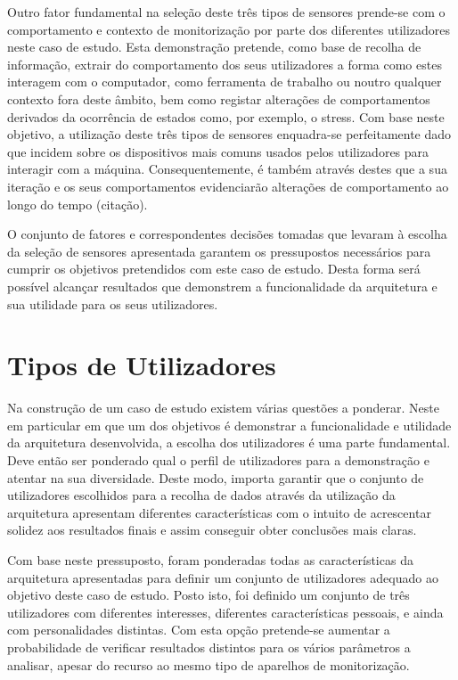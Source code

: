 Outro fator fundamental na seleção deste três tipos de sensores prende-se com o comportamento e contexto de monitorização por parte dos diferentes utilizadores neste caso de estudo. Esta demonstração pretende, como base de recolha de informação, extrair do comportamento dos seus utilizadores a forma como estes interagem com o computador, como ferramenta de trabalho ou noutro qualquer contexto fora deste âmbito, bem como registar alterações de comportamentos derivados da ocorrência de estados como, por exemplo, o stress. Com base neste objetivo, a utilização deste três tipos de sensores enquadra-se perfeitamente dado que incidem sobre os dispositivos mais comuns usados pelos utilizadores para interagir com a máquina. Consequentemente, é também através destes que a sua iteração e os seus comportamentos evidenciarão alterações de comportamento ao longo do tempo (citação). 

O conjunto de fatores e correspondentes decisões tomadas que levaram à escolha da seleção de sensores apresentada garantem os pressupostos necessários para cumprir os objetivos pretendidos com este caso de estudo. Desta forma será possível alcançar resultados que demonstrem a funcionalidade da arquitetura e sua utilidade para os seus utilizadores.



\section{Tipos de Utilizadores}

Na construção de um caso de estudo existem várias questões a ponderar. Neste em particular em que um dos objetivos é demonstrar a funcionalidade e utilidade da arquitetura desenvolvida, a escolha dos utilizadores é uma parte fundamental. Deve então ser ponderado qual o perfil de utilizadores para a demonstração e atentar na sua diversidade. Deste modo, importa garantir que o conjunto de utilizadores escolhidos para a recolha de dados através da utilização da arquitetura apresentam diferentes características com o intuito de acrescentar solidez aos resultados finais e assim conseguir obter conclusões mais claras.

Com base neste pressuposto, foram ponderadas todas as características da arquitetura apresentadas para definir um conjunto de utilizadores adequado ao objetivo deste caso de estudo. Posto isto, foi definido um conjunto de três utilizadores com diferentes interesses, diferentes características pessoais, e ainda com personalidades distintas. Com esta opção pretende-se aumentar a probabilidade de verificar resultados distintos para os vários parâmetros a analisar, apesar do recurso ao mesmo tipo de aparelhos de monitorização.

